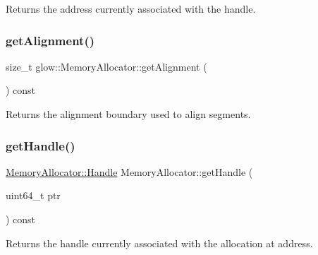 \begin{DoxyReturn}{Returns}
the address currently associated with the {\ttfamily handle}. 
\end{DoxyReturn}
\mbox{\label{classglow_1_1_memory_allocator_a6ca88b0c91e251a8c4fb320b768ef065}} 
\subsubsection{\texorpdfstring{get\+Alignment()}{getAlignment()}}
{\footnotesize\ttfamily size\+\_\+t glow\+::\+Memory\+Allocator\+::get\+Alignment (\begin{DoxyParamCaption}{ }\end{DoxyParamCaption}) const\hspace{0.3cm}{\ttfamily [inline]}}

\begin{DoxyReturn}{Returns}
the alignment boundary used to align segments. 
\end{DoxyReturn}
\mbox{\label{classglow_1_1_memory_allocator_ab5938e2f0d2b448f0c2e11dad152ef8a}} 
\subsubsection{\texorpdfstring{get\+Handle()}{getHandle()}}
{\footnotesize\ttfamily \hyperlink{classglow_1_1_memory_allocator_a8ebc21e1c9250f73f2e85aca3ae4ae9d}{Memory\+Allocator\+::\+Handle} Memory\+Allocator\+::get\+Handle (\begin{DoxyParamCaption}\item[{uint64\+\_\+t}]{ptr }\end{DoxyParamCaption}) const}

\begin{DoxyReturn}{Returns}
the handle currently associated with the allocation at {\ttfamily address}. 
\end{DoxyReturn}
\mbox{\label{classglow_1_1_memory_allocator_a0eb46056b93ae87117ead760dd1cbff6}} 
